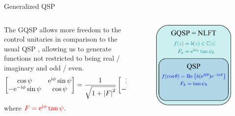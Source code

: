 \begin{frame}{Generalized QSP}
    \begin{columns}
    \begin{column}{0.6\textwidth}
        The GQSP allows more freedom to the control unitaries in comparison to the usual QSP \cite{GQSP_NLFT}, allowing us to generate functions {\color{red}not restricted} to being real / imaginary and odd / even.
        \begin{align}
            \left[\begin{matrix}
                \cos\psi & \mathrm{e}^{\mathrm{i}\phi}\sin\psi \\ -\mathrm{e}^{-\mathrm{i}\phi}\sin\psi & \cos\psi
            \end{matrix}\right] &= \frac{1}{\sqrt{1+\left|{F}\right|^2}} \left[\begin{matrix}
                1 & F \\ -\overline{F} & 1
            \end{matrix}\right],
        \end{align}
        where $\color{red}F = \mathrm{e}^{\mathrm{i}\phi}\tan\psi$.
    \end{column}
    \begin{column}{0.3\textwidth}
        \begin{figure}
            \centering
            \includegraphics[width=1\linewidth]{figures/GQSP_NLFT_QSP.png}
        \end{figure}
    \end{column}
    \end{columns}
\end{frame}
